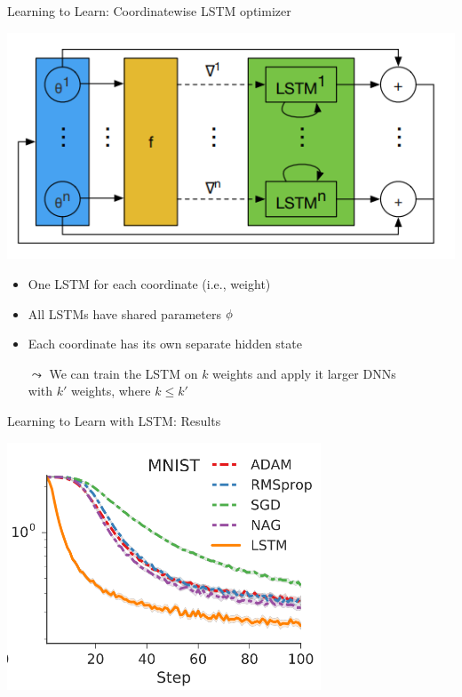 \begin{frame}[c]{Learning to Learn: Coordinatewise LSTM optimizer }

\centering
\includegraphics[width=.7\textwidth]{images/l2l_shared_lstm.png}

\begin{itemize}
\item One LSTM for each coordinate (i.e., weight)
\item All LSTMs have shared parameters $\phi$
\item Each coordinate has its own separate hidden state
\pause
\item[$\leadsto$] We can train the LSTM on $k$ weights and apply it larger DNNs\\ with $k'$ weights, where $k \leq k'$
\end{itemize}

\end{frame}
\begin{frame}[c]{Learning to Learn with LSTM: Results }

\centering
\includegraphics[width=0.7\textwidth]{images/l2l_mnist_base}

\end{frame}
